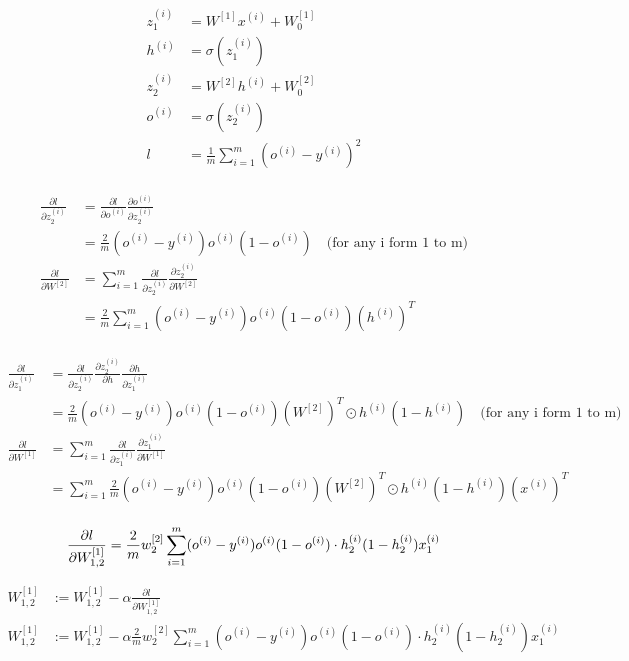 \begin{answer}

    $$
    \begin{aligned}
        z_1^{(i)} &= W^{[1]}x^{(i)} + W^{[1]}_0\\
        h^{(i)} &= \sigma(z_1^{(i)}) \\
        z_2^{(i)} &= W^{[2]}h^{(i)} + W^{[2]}_0\\
        o^{(i)} &= \sigma(z_2^{(i)})\\
        l &= \frac{1}{m}\sum_{i=1}^m(o^{(i)} - y^{(i)})^2\\    
    \end{aligned}
    $$

    $$
    \begin{aligned}
        \frac{\partial{l}}{\partial z_2^{(i)}} &= \frac{\partial{l}}{\partial o^{(i)}} \frac{\partial{o^{(i)}}}{\partial z_2^{(i)}}\\
        &= \frac{2}{m}(o^{(i)} - y^{(i)})o^{(i)}(1-o^{(i)}) \quad \text{(for any i form 1 to m)}\\
        \frac{\partial{l}}{\partial W^{[2]}} &= \sum_{i = 1}^m\frac{\partial{l}}{\partial z_2^{(i)}} \frac{\partial z_2^{(i)}}{\partial W^{[2]}} \\
        &= \frac{2}{m} \sum_{i = 1}^m (o^{(i)} - y^{(i)}) o^{(i)}(1-o^{(i)}) (h^{(i)})^T\\
    \end{aligned}
    $$


    $$
    \begin{aligned}    
        \frac{\partial l}{\partial z_1^{(i)}} &= \frac{\partial{l}}{\partial z_2^{(i)}}\frac{\partial z_2^{(i)}}{\partial h}\frac{\partial h}{\partial z_1^{(i)}} \\
        &=  \frac{2}{m}(o^{(i)} - y^{(i)}) o^{(i)}(1-o^{(i)}) (W^{[2]})^T \odot h^{(i)}(1 - h^{(i)}) \quad \text{(for any i form 1 to m)}\\
        \frac{\partial l}{\partial W^{[1]}} &= \sum_{i = 1}^m \frac{\partial l}{\partial z_1^{(i)}} \frac{\partial z_1^{(i)}}{\partial W^{[1]}} \\
        &= \sum_{i = 1}^m \frac{2}{m}(o^{(i)} - y^{(i)}) o^{(i)}(1-o^{(i)}) (W^{[2]})^T \odot h^{(i)}(1 - h^{(i)}) (x^{(i)})^T \\
    \end{aligned}
    $$

    $$
    \frac{\partial l}{\partial W^{[1]}_{1, 2}} = \frac{2}{m} w_2^{[2]} \sum_{i = 1}^m (o^{(i)} - y^{(i)}) o^{(i)}(1-o^{(i)}) \cdot h_2^{(i)}(1 - h_2^{(i)}) x^{(i)}_1 \\
    $$
    
    $$
    \begin{aligned}
        W^{[1]}_{1, 2} &:= W^{[1]}_{1, 2} - \alpha \frac{\partial l}{\partial W^{[1]}_{1, 2}} \\
        W^{[1]}_{1, 2} &:= W^{[1]}_{1, 2} - \alpha \frac{2}{m} w_2^{[2]} \sum_{i = 1}^m (o^{(i)} - y^{(i)}) o^{(i)}(1-o^{(i)}) \cdot h_2^{(i)}(1 - h_2^{(i)}) x^{(i)}_1 \\
    \end{aligned}
    $$
\end{answer}
